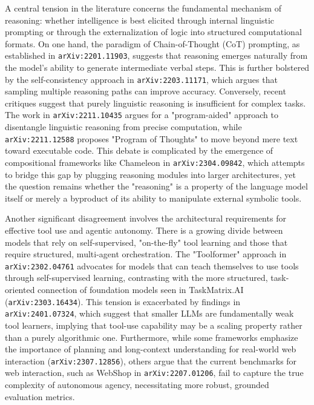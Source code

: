 \documentclass[11pt]{article}
\begin{document}
A central tension in the literature concerns the fundamental mechanism of reasoning: whether intelligence is best elicited through internal linguistic prompting or through the externalization of logic into structured computational formats. On one hand, the paradigm of Chain-of-Thought (CoT) prompting, as established in \texttt{arXiv:2201.11903}, suggests that reasoning emerges naturally from the model's ability to generate intermediate verbal steps. This is further bolstered by the self-consistency approach in \texttt{arXiv:2203.11171}, which argues that sampling multiple reasoning paths can improve accuracy. Conversely, recent critiques suggest that purely linguistic reasoning is insufficient for complex tasks. The work in \texttt{arXiv:2211.10435} argues for a "program-aided" approach to disentangle linguistic reasoning from precise computation, while \texttt{arXiv:2211.12588} proposes "Program of Thoughts" to move beyond mere text toward executable code. This debate is complicated by the emergence of compositional frameworks like Chameleon in \texttt{arXiv:2304.09842}, which attempts to bridge this gap by plugging reasoning modules into larger architectures, yet the question remains whether the "reasoning" is a property of the language model itself or merely a byproduct of its ability to manipulate external symbolic tools.

Another significant disagreement involves the architectural requirements for effective tool use and agentic autonomy. There is a growing divide between models that rely on self-supervised, "on-the-fly" tool learning and those that require structured, multi-agent orchestration. The "Toolformer" approach in \texttt{arXiv:2302.04761} advocates for models that can teach themselves to use tools through self-supervised learning, contrasting with the more structured, task-oriented connection of foundation models seen in TaskMatrix.AI (\texttt{arXiv:2303.16434}). This tension is exacerbated by findings in \texttt{arXiv:2401.07324}, which suggest that smaller LLMs are fundamentally weak tool learners, implying that tool-use capability may be a scaling property rather than a purely algorithmic one. Furthermore, while some frameworks emphasize the importance of planning and long-context understanding for real-world web interaction (\texttt{arXiv:2307.12856}), others argue that the current benchmarks for web interaction, such as WebShop in \texttt{arXiv:2207.01206}, fail to capture the true complexity of autonomous agency, necessitating more robust, grounded evaluation metrics.
\end{document}

